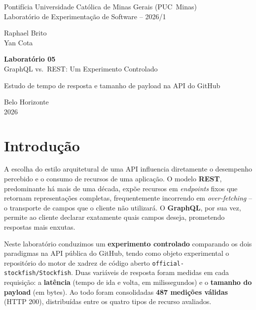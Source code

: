\documentclass[10pt,a4paper,twocolumn]{article}
\begin{document}
\onecolumn

\begin{titlepage}
  \centering
  \vspace*{2.0cm}

  {\normalsize
    Pontifícia Universidade Católica de Minas Gerais (PUC~Minas)\\
    Laboratório de Experimentação de Software -- 2026/1
  }

  \vspace*{2.8cm}

  {\large
    Raphael Brito\\[0.3em]
    Yan Cota
  }

  \vspace*{4.2cm}

  {\LARGE \textbf{Laboratório 05}\\[0.5em]
  \Large GraphQL vs.\ REST: Um Experimento Controlado}

  \vspace*{0.6em}
  {\normalsize Estudo de tempo de resposta e tamanho de payload na API do GitHub}

  \vfill

  {\normalsize Belo Horizonte\\ 2026}
\end{titlepage}

\tableofcontents
\newpage
{}
\setcounter{page}{1}
\twocolumn

\section{Introdução}

A escolha do estilo arquitetural de uma API influencia diretamente o
desempenho percebido e o consumo de recursos de uma aplicação. O modelo
\textbf{REST}, predominante há mais de uma década, expõe recursos em
\textit{endpoints} fixos que retornam representações completas, frequentemente
incorrendo em \textit{over-fetching} -- o transporte de campos que o cliente
não utilizará. O \textbf{GraphQL}, por sua vez, permite ao cliente declarar
exatamente quais campos deseja, prometendo respostas mais enxutas.

Neste laboratório conduzimos um \textbf{experimento controlado} comparando os
dois paradigmas na API pública do GitHub, tendo como objeto experimental o
repositório do motor de xadrez de código aberto
\texttt{official-stockfish/Stockfish}. Duas variáveis de resposta foram
medidas em cada requisição: a \textbf{latência} (tempo de ida e volta, em
milissegundos) e o \textbf{tamanho do payload} (em bytes). Ao todo foram
consolidadas \textbf{487 medições válidas} (HTTP 200), distribuídas entre os
quatro tipos de recurso avaliados.
\end{document}
